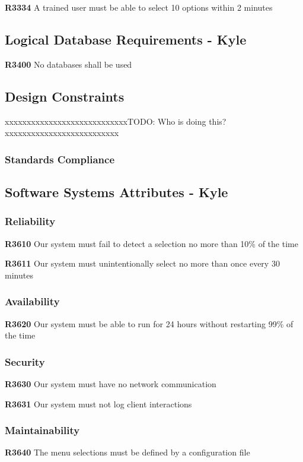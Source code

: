 \documentclass{article}
\begin{document}
\textbf{R3334} A trained user must be able to select 10 options within 2 minutes
\setlength\parindent{0pt}

\subsection{Logical Database Requirements - Kyle}
\textbf{R3400} No databases shall be used


\subsection{Design Constraints}
{\color{red}xxxxxxxxxxxxxxxxxxxxxxxxxxxxTODO: Who is doing this?xxxxxxxxxxxxxxxxxxxxxxxxxx}

\subsubsection{Standards Compliance}

\subsection{Software Systems Attributes - Kyle}

\subsubsection{Reliability} 
\textbf{R3610} Our system must fail to detect a selection no more than 10\% of the time

\textbf{R3611} Our system must unintentionally select no more than once every 30 minutes

\subsubsection{Availability}
\textbf{R3620} Our system must be able to run for 24 hours without restarting 99\% of the time

\subsubsection{Security}
\textbf{R3630} Our system must have no network communication

\textbf{R3631} Our system must not log client interactions

\subsubsection{Maintainability}
\textbf{R3640} The menu selections must be defined by a configuration file
\end{document}
